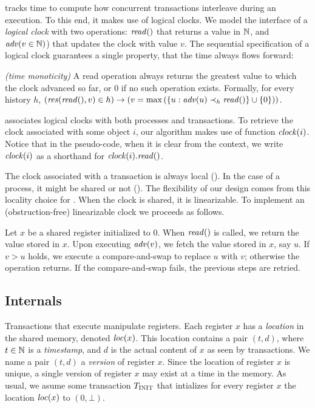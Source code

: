  tracks time to compute how concurrent transactions interleave during an execution.
To this end, it makes use of logical clocks.
We model the interface of a \emph{logical clock} with two operations:
$\cread$ that returns a value in $\naturalSet$, 
and $\cadv{v \in \naturalSet}$) that updates the clock with value $v$.
The sequential specification of a logical clock guarantees a single property, that the time always flows forward:
\begin{inparaenum}
\item[\emph{(time monoticity)}]
  A read operation always returns the greatest value to which the clock advanced so far, or $0$ if no such operation exists.
  Formally, for every history $h$, $(\responseAny{\cread}{v} \in h) \implies (v = \max{(\{u : \cadv{u} \hb_h \cread \} \union \{0\})})$.
\end{inparaenum}

 associates logical clocks with both processes and transactions.
To retrieve the clock associated with some object $i$, our algorithm makes use of function $\clockOf{i}$.
Notice that in the pseudo-code, when it is clear from the context, 
we write $\clockOf{i}$ as a shorthand for $\clockOf{i}.\mathit{read}()$.

The clock associated with a transaction is always local ().
In the case of a process, it might be shared or not ().
The flexibility of our design comes from this locality choice for .
When the clock is shared, it is linearizable.
To implement an (obstruction-free) linearizable clock we proceeds as follows.
\begin{construction}
  Let $x$ be a shared register initialized to $0$.
  When $\cread$ is called, we return the value stored in $x$.
  Upon executing $\cadv{v}$, we fetch the value stored in $x$, say $u$.
  If $v > u$ holds, we execute a compare-and-swap to replace $u$ with $v$; 
  otherwise the operation returns.
  If the compare-and-swap fails, the previous steps are retried.
\end{construction}



\subsection{Internals}

Transactions that execute  manipulate registers.
Each register $x$ has a \emph{location} in the shared memory, denoted $\locationOf{x}$.
This location contains a pair $(t,d)$, where $t \in \naturalSet$ is a \emph{timestamp}, 
and $d$ is the actual content of $x$ as seen by transactions.
We name a pair $(t,d)$ a \emph{version} of register $x$.
Since the location of register $x$ is unique, a single version of register $x$ may exist at a time in the memory.
As usual, we asume some transaction $\transInit$ that intializes 
for every register $x$ the location $\locationOf{x}$ to $(0,\bot)$.

